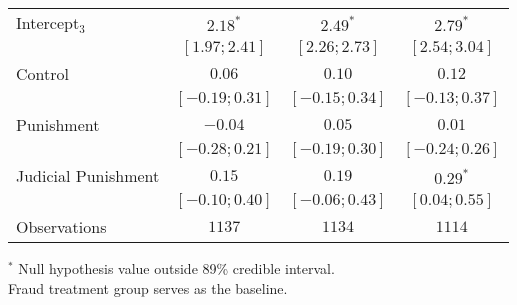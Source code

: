 \begin{table}[h]
\begin{center}
\begin{threeparttable}
\begin{tabular}{l c c c}
Intercept$_3$       & $2.18^{*}$        & $2.49^{*}$        & $2.79^{*}$        \\
                    & $ [ 1.97;  2.41]$ & $ [ 2.26;  2.73]$ & $ [ 2.54;  3.04]$ \\
Control             & $0.06$            & $0.10$            & $0.12$            \\
                    & $ [-0.19;  0.31]$ & $ [-0.15;  0.34]$ & $ [-0.13;  0.37]$ \\
Punishment          & $-0.04$           & $0.05$            & $0.01$            \\
                    & $ [-0.28;  0.21]$ & $ [-0.19;  0.30]$ & $ [-0.24;  0.26]$ \\
Judicial Punishment & $0.15$            & $0.19$            & $0.29^{*}$        \\
                    & $ [-0.10;  0.40]$ & $ [-0.06;  0.43]$ & $ [ 0.04;  0.55]$ \\
\hline
Observations        & $1137$            & $1134$            & $1114$            \\
\hline
\end{tabular}
\begin{tablenotes}[flushleft]
\scriptsize{$^*$ Null hypothesis value outside 89\% credible interval.  \\
Fraud treatment group serves as the baseline.}
\end{tablenotes}
\end{threeparttable}
\label{table:coefficients}
\end{center}
\end{table}
